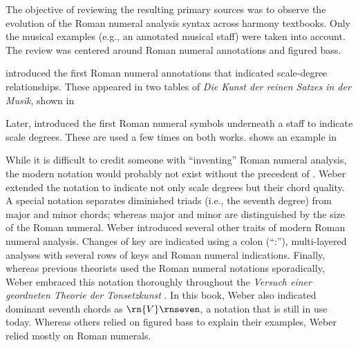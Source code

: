 The objective of reviewing the resulting primary sources was
to observe the evolution of the Roman numeral analysis
syntax across harmony textbooks. Only the musical examples
(e.g., an annotated musical staff) were taken into account.
The review was centered around Roman numeral annotations and
figured bass.

\textcite{kirnberger1774kunst} introduced the first Roman
numeral annotations that indicated scale-degree
relationships. These appeared in two tables of \emph{Die
Kunst der reinen Satzes in der Musik}, shown in


Later, \textcite{vogler1778grunde, vogler1802handbuch}
introduced the first Roman numeral symbols underneath a
staff to indicate scale degrees. These are used a few times
on both works.
 shows
an example in \textcite{vogler1778grunde}


While it is difficult to credit someone with ``inventing''
Roman numeral analysis, the modern notation would probably
not exist without the precedent of
\textcite{weber1817versuch}. Weber extended the notation to
indicate not only scale degrees but their chord quality. A
special notation separates diminished triads (i.e., the
seventh degree) from major and minor chords; whereas major
and minor are distinguished by the size of the Roman
numeral. Weber introduced several other traits of modern
Roman numeral analysis. Changes of key are indicated using a
colon (``:''), multi-layered analyses with several rows of
keys and Roman numeral indications. Finally, whereas
previous theorists used the Roman numeral notations
sporadically, Weber embraced this notation thoroughly
throughout the \emph{Versuch einer geordneten Theorie der
Tonsetzkunst} \parencite{weber1817versuch}. In this book,
Weber also indicated dominant seventh chords as
$\rn{V}\rnseven$, a notation that is still in use today.
Whereas others relied on figured bass to explain their
examples, Weber relied mostly on Roman numerals.


